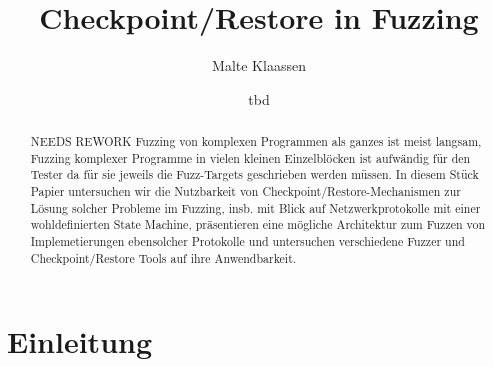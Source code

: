 \documentclass[a4paper]{article}
\begin{document}
\author{Malte Klaassen}
\date{tbd}
\title{Checkpoint/Restore in Fuzzing}

\maketitle

\begin{abstract}
    NEEDS REWORK Fuzzing von komplexen Programmen als ganzes ist meist langsam, Fuzzing komplexer Programme in vielen kleinen Einzelblöcken ist aufwändig für den Tester da für sie jeweils die Fuzz-Targets geschrieben werden müssen. In diesem Stück Papier untersuchen wir die Nutzbarkeit von Checkpoint/Restore-Mechanismen zur Lösung solcher Probleme im Fuzzing, insb. mit Blick auf Netzwerkprotokolle mit einer wohldefinierten State Machine, präsentieren eine mögliche Architektur zum Fuzzen von Implemetierungen ebensolcher Protokolle und untersuchen verschiedene Fuzzer und Checkpoint/Restore Tools auf ihre Anwendbarkeit.
\end{abstract}

\tableofcontents

\section{Einleitung}
\end{document}
